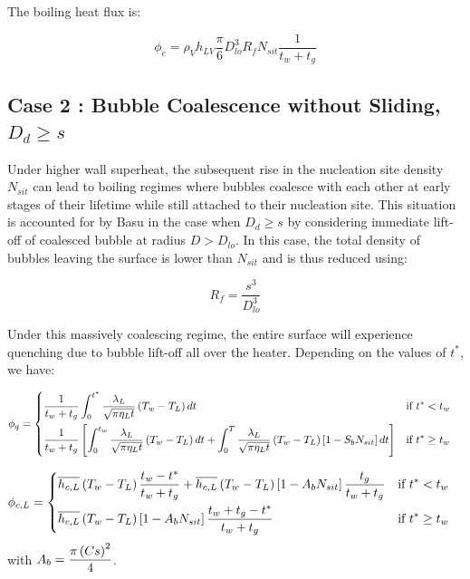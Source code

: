 \npar
The boiling heat flux is:

\begin{equation}
\phi_{e} = \rho_{V}h_{LV}\frac{\pi}{6}D_{lo}^{3}R_{f}N_{sit}\frac{1}{t_{w}+t_{g}}
\label{eq:basu_hfp_phie}
\end{equation}


\subsection{Case 2 : Bubble Coalescence without Sliding, $D_{d}\geq s$}

Under higher wall superheat, the subsequent rise in the nucleation site density $N_{sit}$ can lead to boiling regimes where bubbles coalesce with each other at early stages of their lifetime \ie while still attached to their nucleation site. This situation is accounted for by Basu \etal in the case when $D_{d} \geq s$ by considering immediate lift-off of coalesced bubble at radius $D > D_{lo}$. In this case, the total density of bubbles leaving the surface is lower than $N_{sit}$ and is thus reduced using:

\begin{equation}
R_{f} = \frac{s^{3}}{D_{lo}^{3}}
\end{equation}

Under this massively coalescing regime, the entire surface will experience quenching due to bubble lift-off all over the heater. Depending on the values of $t^{*}$, we have:

\begin{align}
\phi_{q} &= 
\begin{dcases} \dfrac{1}{t_{w}+t_{g}} \int_{0}^{t^{*}}\dfrac{\lambda_{L}}{\sqrt{\pi \eta_{L}t}}\parth{T_{w}-T_{L}}dt & \text{if } t^{*}<t_{w} \\
%
\dfrac{1}{t_{w}+t_{g}} \crocht{ \int_{0}^{t_{w}}\dfrac{\lambda_{L}}{\sqrt{\pi \eta_{L}t}}\parth{T_{w}-T_{L}}dt + \int_{0}^{T}\dfrac{\lambda_{L}}{\sqrt{\pi \eta_{L}t}}\parth{T_{w}-T_{L}}\crocht{1-S_{b}N_{sit}}dt} & \text{if } t^{*}\geq t_{w} 
\end{dcases}
\end{align}

\begin{align}
\phi_{c,L} &= 
\begin{dcases} \overline{h_{c,L}}\parth{T_{w}-T_{L}}\frac{t_{w}-t^{*}}{t_{w}+t_{g}} + \overline{h_{c,L}}\parth{T_{w}-T_{L}}\crocht{1-A_{b}N_{sit}}\frac{t_{g}}{t_{w}+t_{g}} & \text{if } t^{*}<t_{w} \\
%
\overline{h_{c,L}}\parth{T_{w}-T_{L}}\crocht{1-A_{b}N_{sit}}\frac{t_{w}+t_{g}-t^{*}}{t_{w}+t_{g}} & \text{if } t^{*}\geq t_{w} 
\end{dcases}
\end{align}
with $A_{b} = \dfrac{\pi \left( Cs \right)^{2}}{4}$.
\npar

